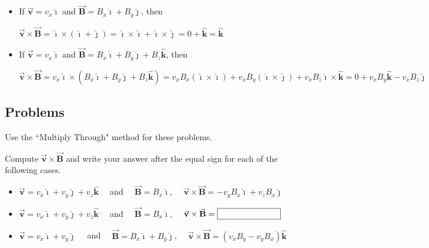 \documentclass{article}
\newcommand{\ihat}[0]{\hat{\boldsymbol{\imath}}}
\newcommand{\jhat}[0]{\hat{\boldsymbol{\jmath}}}
\newcommand{\khat}[0]{\hat{\boldsymbol{k}}}
\newcommand{\bfvec}[1]{\vec{\mathbf{#1}}}
\begin{document}
\begin{itemize}

  \item If $\bfvec{v}=v_x\ihat$ and $\bfvec{B}=B_x\ihat+B_y\jhat$, then

        $\bfvec{v}\times\bfvec{B} = \ihat\times(\ihat+\jhat) = \ihat\times\ihat + \ihat\times\jhat = 0 + \khat = \khat$

  \item If $\bfvec{v}=v_x\ihat$ and $\bfvec{B}=B_x\ihat+B_y\jhat + B_z\khat$, then

        $\bfvec{v}\times\bfvec{B} = v_x\ihat\times(B_x\ihat+B_y\jhat+B_z\khat) = v_xB_x(\ihat\times\ihat) + v_xB_y(\ihat\times\jhat) + v_xB_z\ihat\times\khat = 0 + v_xB_y\khat - v_xB_z\jhat$

\end{itemize}

\subsection{Problems}

Use the ``Multiply Through" method for these problems.

Compute $\bfvec{v}\times\bfvec{B}$ and write your answer after the equal sign for each of the following cases.

\ifsolutions
    \begin{itemize}

      \item $\bfvec{v}=v_x\ihat+v_y\jhat+v_z\khat\quad$ and $\quad\bfvec{B}=B_x\ihat$, $\quad\bfvec{v}\times\bfvec{B} = \boxed{-v_yB_x\ihat+v_zB_x\jhat}$

    \end{itemize}
\else
\vskip 48pt

    \begin{itemize}

      \item $\bfvec{v}=v_x\ihat+v_y\jhat+v_z\khat\quad$ and $\quad\bfvec{B}=B_x\ihat$, $\quad\bfvec{v}\times\bfvec{B} = \fbox{\qquad\qquad\qquad\phantom M}$

    \end{itemize}
\fi

\ifsolutions
    \begin{itemize}

      \item $\bfvec{v}=v_x\ihat+v_y\jhat\quad$ and $\quad\bfvec{B}=B_x\ihat+B_y\jhat$, $\quad\bfvec{v}\times\bfvec{B} = \boxed{(v_xB_y-v_yB_x)\khat}$

    \end{itemize}
\else
\vskip 48pt
\end{document}
